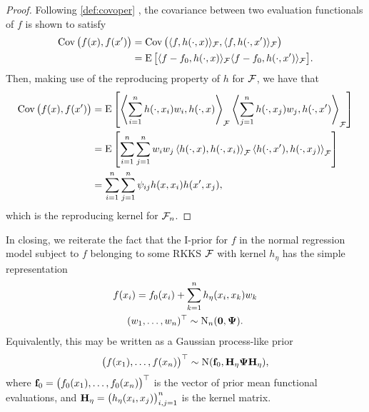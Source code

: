 \begin{proof}
  Following \cref{def:covoper} , the covariance between two evaluation functionals of $f$ is shown to satisfy 
  \begin{align*}
    \operatorname{Cov}\big(f(x),f(x')\big)
    &= \operatorname{Cov}\big(\langle f,h(\cdot,x)\rangle_{{\mathcal F}}, \langle f,h(\cdot,x')\rangle_{{\mathcal F}} \big) \\
    &= \operatorname{E}\big[\langle f-f_0,h(\cdot,x)\rangle_{{\mathcal F}}\langle f-f_0,h(\cdot,x')\rangle_{{\mathcal F}} \big].
  \end{align*}
  Then, making use of the reproducing property of $h$ for ${\mathcal F}$, we have that
  \begin{align*}
    \operatorname{Cov}\big(f(x),f(x')\big)
    &= \operatorname{E} \left[ 
    \left\langle \sum_{i=1}^n h(\cdot,x_i)w_i, h(\cdot,x) \right\rangle_{{\mathcal F}} 
    \left\langle \sum_{j=1}^n h(\cdot,x_j)w_j, h(\cdot,x') \right\rangle_{{\mathcal F}} 
    \right] \\
    &= \operatorname{E} \left[ 
    \sum_{i=1}^n\sum_{j=1}^n w_iw_j \left\langle  h(\cdot,x), h(\cdot,x_i) \right\rangle_{{\mathcal F}} 
     \left\langle h(\cdot,x'), h(\cdot,x_j)\right\rangle_{{\mathcal F}} 
    \right] \\
    &= \sum_{i=1}^n\sum_{j=1}^n \psi_{ij} h(x,x_i) h(x',x_j),
  \end{align*}
  which is the reproducing kernel for ${\mathcal F}_n$.
\end{proof}

In closing, we reiterate the fact that the I-prior for $f$ in the normal regression model subject to $f$ belonging to some RKKS ${\mathcal F}$ with kernel $h_\eta$ has the simple representation
\begin{align}\label{eq:iprior2}
  \begin{gathered}
    f(x_i) = f_0(x_i) + \sum_{k=1}^n h_\eta(x_i,x_k)w_k \\
    (w_1,\dots,w_n)^\top \sim \operatorname{N}_n({\mathbf 0},{\bm\Psi}).
  \end{gathered}
\end{align}
Equivalently, this may be written as a Gaussian process-like prior 
\begin{align}\label{eq:iprior3}
  \big(f(x_1),\dots,f(x_n) \big)^\top \sim \operatorname{N}({\mathbf f}_0,{\mathbf H}_\eta{\bm\Psi}{\mathbf H}_\eta),
\end{align}
where ${\mathbf f}_0 = \big(f_0(x_1),\dots,f_0(x_n) \big)^\top$ is the vector of prior mean functional evaluations, and ${\mathbf H}_\eta = \big(h_\eta(x_i,x_j)\big)_{i,j=1}^n$ is the kernel matrix.
